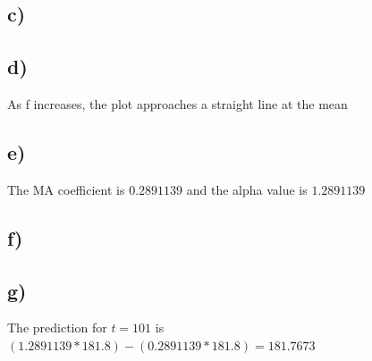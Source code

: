 \documentclass[paper=a4, fontsize=11pt]{scrartcl} %
\numberwithin{equation}{section} %
\numberwithin{figure}{section} %
\numberwithin{table}{section} %
\begin{document}
\subsection*{c)}

\subsection*{d)}
As f increases, the plot approaches a straight line at the mean


\subsection*{e)}
The MA coefficient is $0.2891139$ and the alpha value is $1.2891139$

\subsection*{f)}

\subsection*{g)}
The prediction for $t = 101$ is $(1.2891139 * 181.8) - (0.2891139 * 181.8) = 181.7673$
\end{document}
